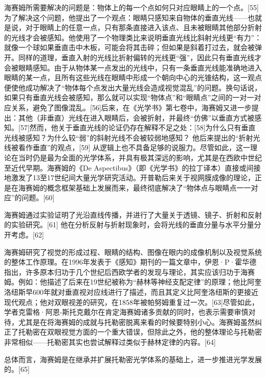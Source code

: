 海赛姆所需要解决的问题是：物体上的每一个点如何只对应眼睛上的一个点。[55]为了解决这个问题，他提出了一个观点：眼睛只感知来自物体的垂直光线——也就是说，对于眼睛上的任意一点，只有那条直接进入该点、且未被眼睛其他部分折射的光线才会被感知。他使用了一个物理类比来说明垂直光线比斜射光线更“有力”：就像一个球如果垂直击中木板，可能会将其击碎；但如果是斜着打过去，就会被弹开。同样的道理，垂直入射的光线比折射偏转的光线更“强”，因此只有垂直光线才会被眼睛感知。由于从物体某一点发出的光线中，只有一条垂直光线能准确地进入眼睛的某一点，且所有这些光线在眼睛中形成一个朝向中心的光锥结构，这一观点便使他成功解决了“物体每个点发出大量光线会造成视觉混乱”的问题。换句话说，如果只有垂直光线会被感知，那么就可以实现“物体点”和“眼睛点”之间的一对一对应关系，避免了图像混乱。[56]后来，在《光学书》第七卷中，海赛姆又进一步提出：其他（非垂直）光线在进入眼睛后，会被折射，并最终“仿佛”以垂直方式被感知。[57]然而，他关于垂直光线的论证仍存在解释不足之处：[58]为什么只有垂直光线被感知？为什么较“弱”的斜射光线不会被较弱地感知？
他后来提出的“折射光线被看作垂直”的观点，[59] 从逻辑上也不具备足够的说服力。尽管如此，这一理论在当时仍是最为全面的光学体系，并具有极其深远的影响，尤其是在西欧中世纪至近代早期。海赛姆的《De Aspectibus》（即《光学书》的拉丁译本）直接或间接地激发了13至17世纪间大量光学研究活动。开普勒后来关于视网膜成像的理论，正是在海赛姆的概念框架基础上发展而来，最终彻底解决了“物体点与眼睛点一一对应”的问题。[60]

海赛姆通过实验证明了光沿直线传播，并进行了大量关于透镜、镜子、折射和反射的实验研究。[61] 他在分析反射与折射现象时，会将光线的垂直分量与水平分量分开考虑。[62]

海赛姆研究了视觉的形成过程、眼睛的结构、图像在眼内的成像机制以及视觉系统的整体工作原理。在1996年发表于《感知》期刊的一篇文章中，伊恩·P·霍华德指出，许多原本归功于几个世纪后西欧学者的发现与理论，其实应该归功于海赛姆。例如：他描述了后来在19世纪被称为“赫林等神经支配定律”的原理；他比阿奎洛纽斯早600年就对垂直视对应线进行了描述，而且其定义比阿奎洛纽斯的更接近现代观点；他对双眼视差的研究，在1858年被帕努姆重复过一次。[63]尽管如此，学者克雷格·阿恩-斯托克戴尔在肯定海赛姆诸多贡献的同时，也表示需要审慎对待，尤其是在将海赛姆的成就与托勒密脱离来看的时候要特别小心。海赛姆虽然纠正了托勒密在双眼视觉方面的一个重大错误，但除此之外，他的整体理论与托勒密非常相似——托勒密其实也尝试解释过类似于赫林定律的内容。[64]

总体而言，海赛姆是在继承并扩展托勒密光学体系的基础上，进一步推进光学发展的。[65]

